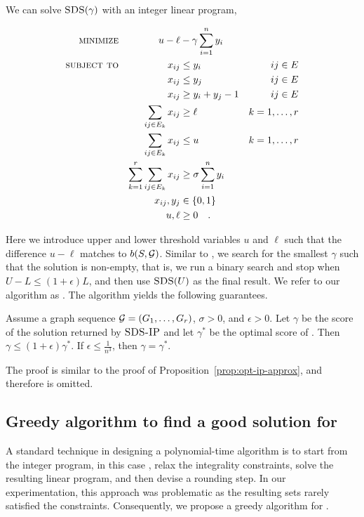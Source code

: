 We can solve $\textsc{SDS}(\gamma)$ with an integer linear program,

\begin{align*}
\textsc{minimize}&&  u - \ell & - \gamma \sum_{i = 1}^n y_i  \nonumber\\  
\textsc{subject to} && 
  x_{ij} & \leq y_i &  ij \in E   \\
&& x_{ij} & \leq y_j &  ij \in E \\
&& x_{ij} & \geq y_i + y_j - 1 &  ij \in E \\
&&  \sum_{ ij \in E_k} x_{ij} & \geq \ell &  k = 1,\dots, r \\
&&  \sum_{ ij \in E_k} x_{ij} & \leq u  &  k = 1,\dots, r \\
&& \sum_{k = 1}^r \sum_{ ij \in E_k} x_{ij} & \geq  \sigma  \sum_{i = 1}^{n} y_i\\
&& x_{ij}, y_j  & \in \{0,1\} \nonumber\\
&&  u,\ell & \geq 0 \nonumber\quad.
\end{align*}

Here we introduce upper and lower threshold variables $u$ and $\ell$ such that the difference $u - \ell$ matches to $b(S, {\mathcal G})$.
Similar to \algipcm, we search for the smallest $\gamma$ such that the solution is non-empty, that is, we run a binary search and stop when $U - L \leq (1 + \epsilon)L$, and then use $\textsc{SDS}(U)$ as the final result. We refer to our algorithm as \algipdiff. The algorithm yields the following guarantees.

\begin{proposition}
Assume a graph sequence ${\mathcal G} = (G_1,\dots,G_r)$, $\sigma > 0$, and $\epsilon > 0$. 
Let $\gamma$ be the score of the solution returned by $\textsc{SDS-IP}$ and let $\gamma^*$ be the optimal score of \problemcdcsdiff. Then $\gamma \leq (1 + \epsilon)\gamma^*$.
If $\epsilon \leq \frac{1}{n^3}$, then $\gamma = \gamma^*$.
\label{prop:opt-sbs-approx}
\end{proposition}
The proof is similar to the proof of Proposition~\ref{prop:opt-ip-approx}, and therefore is omitted.


\subsection{Greedy algorithm to find a good solution for  \problemcdcsdiff}

A standard technique in designing a polynomial-time algorithm is to start from the integer program, in this case \algipdiff, relax the integrality constraints, solve the resulting linear program, and then devise a rounding step. In our experimentation, this approach was problematic as the resulting sets rarely satisfied the constraints.
Consequently, we propose a greedy algorithm for \problemcdcsdiff. 

